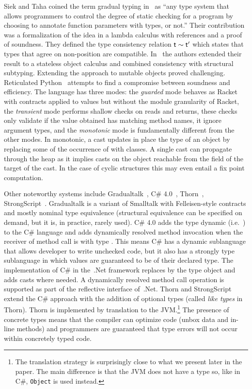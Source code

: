 \documentclass[acmlarge, anonymous, authordraft, review]{acmart} %
\newcommand{\code}[1]{{\tt #1}\xspace}
\begin{document}
Siek and Taha coined the term gradual typing in~\cite{SiekTaha06} as ``any
type system that allows programmers to control the degree of static checking
for a program by choosing to annotate function parameters with types, or
not.'' Their contribution was a formalization of the idea in a lambda
calculus with references and a proof of soundness. They defined the type
consistency relation $\t \sim \tp$ which states that types that agree on
non-\any position are compatible.  In~\cite{SiekTaha07} the authors extended
their result to a stateless object calculus and combined consistency with
structural subtyping. Extending the approach to mutable objects proved
challenging. Reticulated Python~\cite{siek14} attempts to find a compromise
between soundness and efficiency.  The language has three modes: the
\emph{guarded} mode behaves as Racket with contracts applied to values but
without the module granularity of Racket, the \emph{transient} mode performs
shallow checks on reads and returns, these checks only validate if the value
obtained has matching method names, it ignore argument types, and the
\emph{monotonic} mode is fundamentally different from the other modes. In
monotonic, a cast updates in place the type of an object by replacing some
of the occurrence of \any with classes. A single cast can propagate through
the heap as it implies casts on the object reachable from the field of the
target of the cast. In the case of cyclic structures this may even entail
a fix point computation.

Other noteworthy systems include Gradualtalk~\cite{GS13}, C\#
4.0~\cite{Bierman10}, Thorn~\cite{oopsla09},
StrongScript~\cite{ecoop15}. Gradualtalk is a variant of Smalltalk with
Felleisen-style contracts and mostly nominal type equivalence (structural
equivalence can be specified on demand, but it is, in practice, rarely
used). C\# 4.0 adds the type {\sf dynamic} (i.e.~\any) to the C\# language
and adds dynamically resolved method invocation when the receiver of method
call is with type \any.  This means C\# has a dynamic sublanguage that
allows developer to write unchecked code, but it also has a strongly type
sublanguage in which values are guaranteed to be of their declared type.
The implementation of C\# in the~.Net framework replaces \any by the type
{\sf object} and adds casts where needed. A dynamically resolved method call
operation is supported as part of the reflective interface of~.Net.  Thorn
and StrongScript extend the C\# approach with the addition of optional types
(called {\em like types} in Thorn).  Thorn is implemented by translation to
the JVM.\footnote{The translation strategy is surprisingly close to what we
  present later in the paper. The main difference is that the JVM does not
  have a type \any so, like in C\#, \code{Object} is used instead.} The
presence of concrete types means that the compiler can optimize code (unbox
data and in-line methods) and programmers are guaranteed that type errors
will not occur within concretely typed code.
\end{document}
